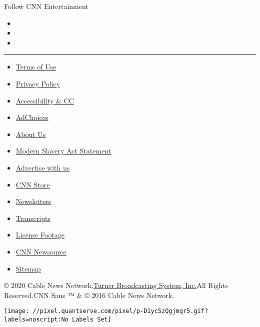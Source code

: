 Follow CNN Entertainment

\begin{itemize}
\item
\item
\item
\end{itemize}

\begin{center}\rule{0.5\linewidth}{\linethickness}\end{center}

\begin{itemize}
\tightlist
\item
  \href{/terms}{Terms of Use}
\item
  \href{/privacy}{Privacy Policy}
\item
  \href{/accessibility}{Accessibility \& CC}
\item
  \protect\hyperlink{}{AdChoices}
\item
  \href{/about}{About Us}
\item
  \href{/msa}{Modern Slavery Act Statement}
\item
  \href{https://commercial.cnn.com}{Advertise with us}
\item
  \href{//store.cnn.com}{CNN Store}
\item
  \href{/newsletters}{Newsletters}
\item
  \href{/transcripts}{Transcripts}
\item
  \href{/collection}{License Footage}
\item
  \href{http://cnnnewsource.com}{CNN Newsource}
\item
  \href{https://www.cnn.com/sitemap.html}{Sitemap}
\end{itemize}

© 2020 Cable News Network.\href{//www.turner.com}{Turner Broadcasting
System, Inc.}All Rights Reserved.CNN Sans ™ \& © 2016 Cable News
Network.

\texttt{[image: //pixel.quantserve.com/pixel/p-D1yc5zQgjmqr5.gif?labels=noscript:No Labels Set]}
